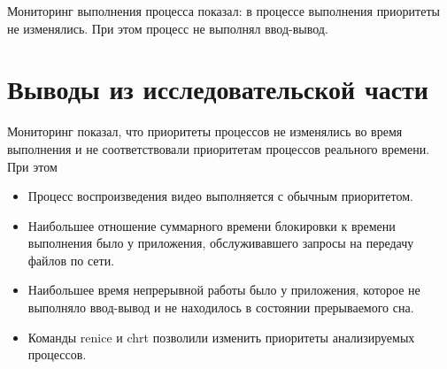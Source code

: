 Мониторинг выполнения процесса показал: в процессе выполнения приоритеты не изменялись. При этом процесс не выполнял ввод-вывод.




\section*{Выводы из исследовательской части}

Мониторинг показал, что приоритеты процессов не изменялись во время выполнения и не соответствовали приоритетам процессов реального времени. При этом

\begin{itemize}[label*=---]
	\item Процесс воспроизведения видео выполняется с обычным приоритетом.
	\item Наибольшее отношение суммарного времени блокировки к времени выполнения было у приложения, обслуживавшего запросы на передачу файлов по сети.
	\item Наибольшее время непрерывной работы было у приложения, которое не выполняло ввод-вывод и не находилось в состоянии прерываемого сна.
	\item Команды renice и chrt позволили изменить приоритеты анализируемых процессов.
\end{itemize}
